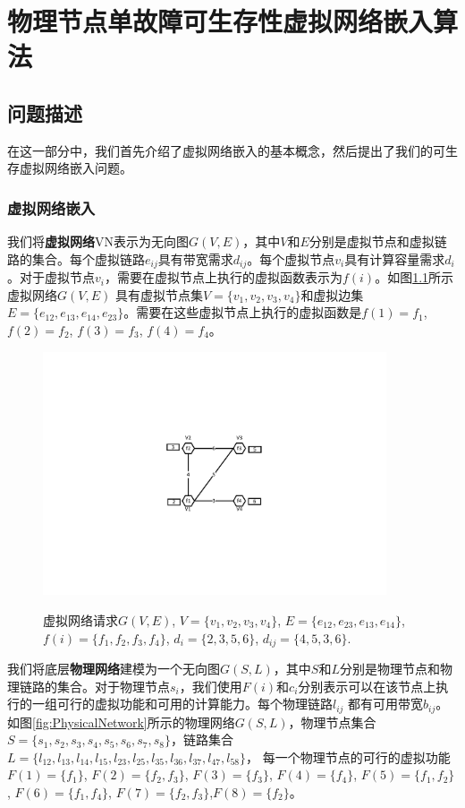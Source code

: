 \chapter{物理节点单故障可生存性虚拟网络嵌入算法}
\section{问题描述}
在这一部分中，我们首先介绍了虚拟网络嵌入的基本概念，然后提出了我们的可生存虚拟网络嵌入问题。
\subsection{虚拟网络嵌入}
我们将\textbf{虚拟网络}VN表示为无向图$G (V,E)$，其中$V$和$E$分别是虚拟节点和虚拟链路的集合。每个虚拟链路$e_{ij}$具有带宽需求$d_{ij}$。每个虚拟节点$v_i$具有计算容量需求$d_i$。对于虚拟节点$v_i$，需要在虚拟节点上执行的虚拟函数表示为$f(i)$。如图\ref{fig:VirtualNetworkRequest}所示虚拟网络$G (V,E)$ 具有虚拟节点集$V=\{v_1,v_2,v_3,v_4\}$和虚拟边集$E= \{e_{12},e_{13},e_{14},e_{23}\}$。需要在这些虚拟节点上执行的虚拟函数是$f(1)=f_1$, $f(2)=f_2$, $f(3)=f_3$, $f(4)=f_4$。

\begin{figure}
\centering
\includegraphics[width=4in]{figures/VirtualNetworkRequest}\\
\caption{虚拟网络请求$G(V,E)$, $V=\{v_1,v_2,v_3,v_4\}$, $E=\{e_{12},e_{23},e_{13},e_{14}\}$,  $f(i)=\{f_1,f_2,f_3,f_4\}$, $d_i=\{2,3,5,6\}$, $d_{ij}=\{4,5,3,6\}. $
}\label{fig:VirtualNetworkRequest}
\end{figure}

我们将底层\textbf{物理网络}建模为一个无向图$G (S,L)$，其中$S$和$L$分别是物理节点和物理链路的集合。对于物理节点$s_i$，我们使用$F(i)$和$c_i$分别表示可以在该节点上执行的一组可行的虚拟功能和可用的计算能力。每个物理链路$l_{ij}$ 都有可用带宽$b_{ij}$。如图\ref{fig:PhysicalNetwork}所示的物理网络$G (S,L)$，物理节点集合$S=\{s_1,s_2,s_3,s_4,s_5,s_6,s_7,s_8\}$，链路集合$L=\{l_{12},l_{13},l_{14},l_{15},l_{23},l_{25},l_{35},l_{36},l_{37},l_{47},l_{58}\}$，
每一个物理节点的可行的虚拟功能$F(1)=\{f_1\}$, $F(2)=\{f_2,f_3\}$, $F(3)=\{f_3\}$, $F(4)=\{f_4\}$, $F(5)=\{f_1,f_2\}$, $F(6)=\{f_1,f_4\}$, $F(7)=\{f_2,f_3\}$,$F(8)=\{f_2\}$。

